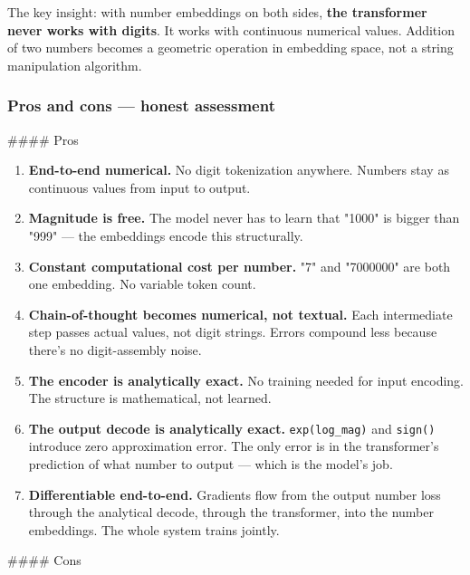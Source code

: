 \documentclass[11pt]{article}
\begin{document}
The key insight: with number embeddings on both sides, \textbf{the transformer never works with digits}. It works with continuous numerical values. Addition of two numbers becomes a geometric operation in embedding space, not a string manipulation algorithm.


\subsubsection*{Pros and cons — honest assessment}


\#\#\#\# Pros


\begin{enumerate}
\item \textbf{End-to-end numerical.} No digit tokenization anywhere. Numbers stay as continuous values from input to output.
\item \textbf{Magnitude is free.} The model never has to learn that "1000" is bigger than "999" — the embeddings encode this structurally.
\item \textbf{Constant computational cost per number.} "7" and "7000000" are both one embedding. No variable token count.
\item \textbf{Chain-of-thought becomes numerical, not textual.} Each intermediate step passes actual values, not digit strings. Errors compound less because there's no digit-assembly noise.
\item \textbf{The encoder is analytically exact.} No training needed for input encoding. The structure is mathematical, not learned.
\item \textbf{The output decode is analytically exact.} \texttt{exp(log\_mag)} and \texttt{sign()} introduce zero approximation error. The only error is in the transformer's prediction of what number to output — which is the model's job.
\item \textbf{Differentiable end-to-end.} Gradients flow from the output number loss through the analytical decode, through the transformer, into the number embeddings. The whole system trains jointly.
\end{enumerate}


\#\#\#\# Cons
\end{document}
